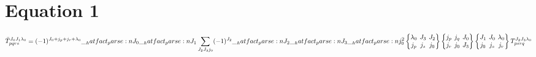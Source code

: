 \documentclass{scrartcl}
\newcommand{\sixj}[6]{\begingroup\setlength{\arraycolsep}{0.2em}\begin{Bmatrix} #1 & #2 & #3 \\ #4 & #5 & #6 \end{Bmatrix}\endgroup}
\begin{document}
\section{Equation 1}
\begin{dmath*}
\bar{T}_{p q r s}^{{J}_{0} {J}_{1} {{\lambda}}_{0}} = (-1)^{{J}_{0}+{j}_{p}+{j}_{r}+{{\lambda}}_{0}} \* \hatfact{{J}_{0}} \* \hatfact{{J}_{1}} \* \sum_{{J}_{2} {J}_{3} {j}_{0}} \* (-1)^{{J}_{2}} \* \hatfact{{J}_{2}} \* \hatfact{{J}_{3}} \* \hatfact{{j}_{0}^{2}} \* \sixj{{{\lambda}}_{0}}{{J}_{3}}{{J}_{2}}{{j}_{p}}{{j}_{s}}{{j}_{0}} \* \sixj{{j}_{p}}{{j}_{q}}{{J}_{0}}{{j}_{r}}{{j}_{0}}{{J}_{3}} \* \sixj{{J}_{1}}{{J}_{0}}{{{\lambda}}_{0}}{{j}_{0}}{{j}_{s}}{{j}_{r}} \* T_{p s r q}^{{J}_{2} {J}_{3} {{\lambda}}_{0}}
\end{dmath*}
\end{document}

